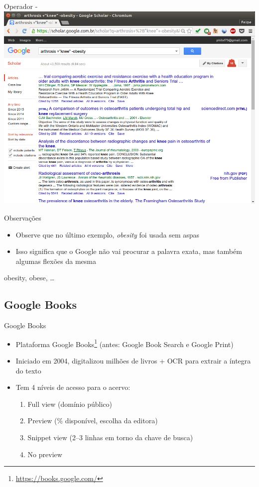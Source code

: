 \documentclass{beamer}
\begin{document}
\begin{frame}{Operador -}
  \includegraphics[height=.85\textheight]{Busca/google-fu-plusminus}
\end{frame}

\begin{frame}{Observações}
  \begin{itemize}
  \item Observe que no último exemplo, {\em obesity} foi usada sem
    aspas
  \item Isso significa que o Google não vai procurar a palavra
    \alert{exata}, mas também algumas flexões da mesma
  \end{itemize}
  \begin{example}
    obesity, obese, \ldots
  \end{example}
\end{frame}

\subsection{Google Books}

\begin{frame}{Google Books}
  \begin{itemize}
  \item Plataforma \alert{Google
      Books}\footnote{\url{https://books.google.com/}} (antes: Google
    Book Search e Google Print)
  \item Iniciado em 2004, digitalizou milhões de livros + OCR para
    extrair a íntegra do texto
  \item Tem 4 níveis de acesso para o acervo:
    \begin{enumerate}
    \item Full view (domínio público)
    \item Preview (\% disponível, escolha da editora)
    \item Snippet view (2--3 linhas em torno da chave de busca)
    \item No preview
    \end{enumerate}
  \end{itemize}
\end{frame}
\end{document}
